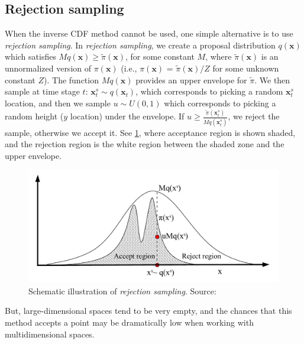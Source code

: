 \subsection{Rejection sampling}
When the inverse \acrshort{CDF} method cannot be used, one simple alternative is to use \textit{rejection sampling}. In \textit{rejection sampling}, we create a proposal distribution $q(\boldsymbol{x})$ which satisfies $Mq(\boldsymbol{x}) \geq \tilde{\pi}(\boldsymbol{x})$, for some constant $M$, where $\tilde{\pi}(\boldsymbol{x})$ is an unnormalized version of $\pi(\boldsymbol{x})$ (i.e., $\pi(\boldsymbol{x})$ = $\tilde{\pi}(\boldsymbol{x})/Z$ for some unknown constant $Z$). The function $Mq(\boldsymbol{x})$ provides an upper envelope for $\tilde{\pi}$. We then sample at time stage $t$: $\boldsymbol{x}_{t}^{s} \sim q(\boldsymbol{x}_{t})$, which corresponds to picking a random $\boldsymbol{x}_{t}^{s}$ location, and then we sample $u \sim U(0,1)$ which corresponds to picking a random height ($y$ location) under the
envelope. If $u \geq \frac{\tilde{\pi}(\boldsymbol{x}_{t}^{s})}{Mq(\boldsymbol{x}_{t}^{s})}$, we reject the sample, otherwise we accept it. See \cref{fig: rejectsampling}, where acceptance region is shown shaded, and the rejection region is the white region between the shaded zone and the upper envelope.
\begin{figure}[htbp]
    \centering
    \includegraphics[width = 140mm]{Figures/figure-rejectionsampling.pdf}
    \caption{Schematic illustration of \textit{rejection sampling}. Source: \protect\cite{andrieu2003}}
    \label{fig: rejectsampling}
\end{figure}
But, large-dimensional spaces tend to be very empty, and the chances that this method accepts a point may be dramatically low when working with multidimensional spaces.
